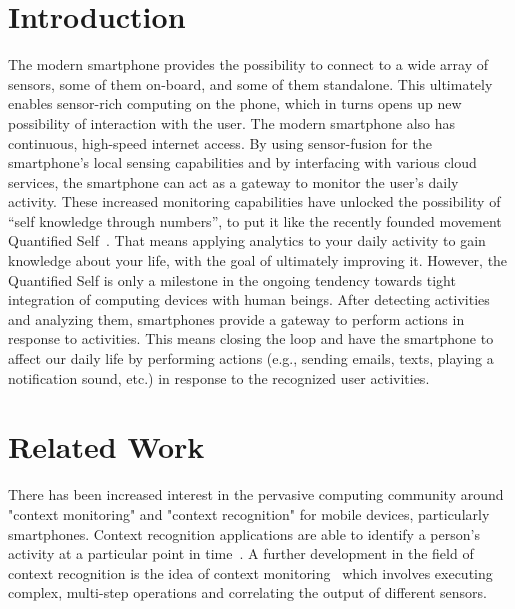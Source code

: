 \documentclass{acm_proc_article-sp}
\begin{document}
\section{Introduction}
The modern smartphone provides the possibility to connect to a wide array of sensors, some of them on-board, and some of them standalone. This ultimately enables sensor-rich computing on the phone, which in turns opens up new possibility of interaction with the user. The modern smartphone also has continuous, high-speed internet access. By using sensor-fusion for the smartphone's local sensing capabilities and by interfacing with various cloud services, the smartphone can act as a gateway to monitor the user's daily activity.
These increased monitoring capabilities have unlocked the possibility of ``self knowledge through numbers'', to put it like the recently founded movement Quantified Self~\cite{quantified:self}. That means applying analytics to your daily activity to gain knowledge about your life, with the goal of ultimately improving it.
However, the Quantified Self is only a milestone in the ongoing tendency towards tight integration of computing devices with human beings. After detecting activities and analyzing them, smartphones provide a gateway to perform actions in response to activities. This means closing the loop and have the smartphone to affect our daily life by performing actions (e.g., sending emails, texts, playing a notification sound, etc.) in response to the recognized user activities.


\section{Related Work}
There has been increased interest in the pervasive computing community around "context monitoring" and "context recognition" for mobile devices, particularly smartphones. Context recognition applications are able to identify a person's activity at a particular point in time~\cite{fahy2004cass}. A further development in the field of context recognition is the idea of context monitoring~\cite{lee2012mobicon} which involves executing complex, multi-step operations and correlating the output of different sensors.
\end{document}

